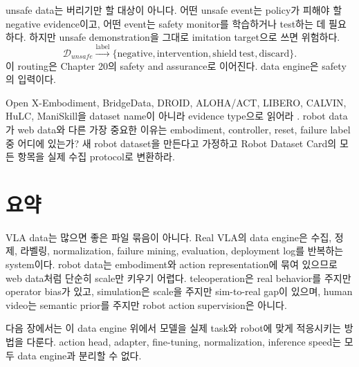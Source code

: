 unsafe data는 버리기만 할 대상이 아니다. 어떤 unsafe event는 policy가 피해야 할 negative evidence이고, 어떤 event는 safety monitor를 학습하거나 test하는 데 필요하다. 하지만 unsafe demonstration을 그대로 imitation target으로 쓰면 위험하다.
\begin{equation}
  \mathcal{D}_{unsafe}
  \xrightarrow{\mathrm{label}}
  \{
  \mathrm{negative},
  \mathrm{intervention},
  \mathrm{shield\ test},
  \mathrm{discard}
  \}.
  \label{eq:ch14-unsafe-routing}
\end{equation}
이 routing은 Chapter 20의 safety and assurance로 이어진다. data engine은 safety의 입력이다.

\chapterwork
{Open X-Embodiment, BridgeData, DROID, ALOHA/ACT, LIBERO, CALVIN, HuLC, ManiSkill을 dataset name이 아니라 evidence type으로 읽어라 \cite{openx2023,bridgedatav22023,droid2024,act2023,libero2023,calvin2022,hulc2022,maniskill22023}.}
{robot data가 web data와 다른 가장 중요한 이유는 embodiment, controller, reset, failure label 중 어디에 있는가?}
{새 robot dataset을 만든다고 가정하고 Robot Dataset Card의 모든 항목을 실제 수집 protocol로 변환하라.}

\section{요약}

VLA data는 많으면 좋은 파일 묶음이 아니다. Real VLA의 data engine은 수집, 정제, 라벨링, normalization, failure mining, evaluation, deployment log를 반복하는 system이다. robot data는 embodiment와 action representation에 묶여 있으므로 web data처럼 단순히 scale만 키우기 어렵다. teleoperation은 real behavior를 주지만 operator bias가 있고, simulation은 scale을 주지만 sim-to-real gap이 있으며, human video는 semantic prior를 주지만 robot action supervision은 아니다.

다음 장에서는 이 data engine 위에서 모델을 실제 task와 robot에 맞게 적응시키는 방법을 다룬다. action head, adapter, fine-tuning, normalization, inference speed는 모두 data engine과 분리할 수 없다.
